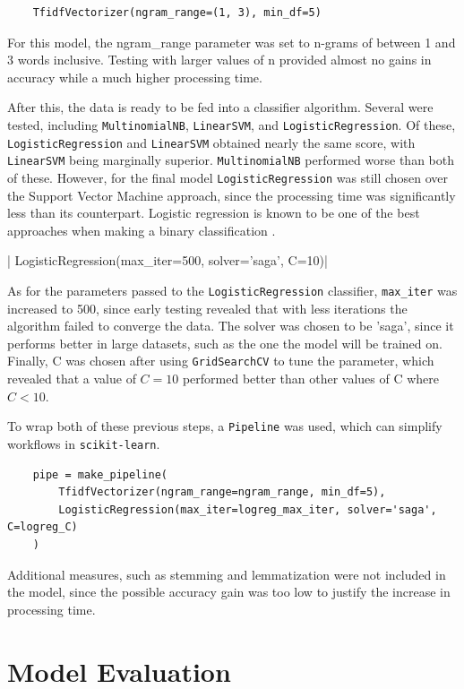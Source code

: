 \documentclass[a4paper,12pt]{article}
\begin{document}
\begin{verbatim}
    TfidfVectorizer(ngram_range=(1, 3), min_df=5)
\end{verbatim}

For this model, the ngram\_range parameter was set to n-grams of between 1 and 3
words inclusive.
Testing with larger values of n provided almost no gains in accuracy while a
much higher processing time.

After this, the data is ready to be fed into a classifier algorithm.
Several were tested, including \texttt{MultinomialNB}, \texttt{LinearSVM}, and \texttt{LogisticRegression}.
Of these, \texttt{LogisticRegression} and \texttt{LinearSVM} obtained nearly the
same score, with \texttt{LinearSVM} being marginally superior.
\texttt{MultinomialNB} performed worse than both of these.
However, for the final model \texttt{LogisticRegression} was still chosen over the 
Support Vector Machine approach, since the processing time was significantly
less than its counterpart. Logistic regression is known to be one of the best
approaches when making a binary classification \parencite{Nick2007}.

|  LogisticRegression(max_iter=500, solver='saga', C=10)|

As for the parameters passed to the \texttt{LogisticRegression} classifier,
\texttt{max\_iter} was increased to 500, since early testing revealed that with
less iterations the algorithm failed to converge the data.
The solver was chosen to be 'saga', since it performs better in large datasets,
such as the one the model will be trained on.
Finally, C was chosen after using \texttt{GridSearchCV} to tune the parameter,
which revealed that a value of \(C=10\) performed better than other values of C
where \(C<10\).

To wrap both of these previous steps, a \texttt{Pipeline} was used, which can simplify workflows in \texttt{scikit-learn}.

\begin{verbatim}
    pipe = make_pipeline(
        TfidfVectorizer(ngram_range=ngram_range, min_df=5),
        LogisticRegression(max_iter=logreg_max_iter, solver='saga', C=logreg_C)
    )
\end{verbatim}

Additional measures, such as stemming and lemmatization were not included in the
model, since the possible accuracy gain was too low to justify the increase
in processing time.

\section{Model Evaluation}
\end{document}
